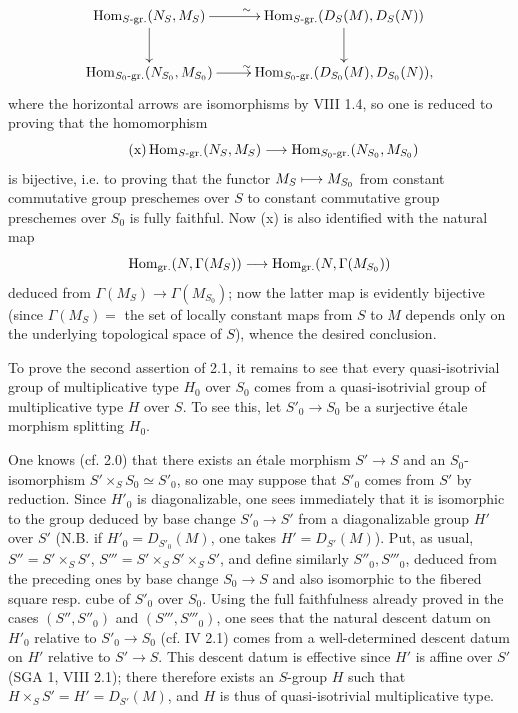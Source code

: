 \[
\xymatrix{\Hom_{S\text{-}\mathrm{gr.}}(N_S,M_S)\ar[r]^\sim\ar[d]&\Hom_{S\text{-}\mathrm{gr.}}(D_S(M),D_S(N))\ar[d]\\\Hom_{S_0\text{-}\mathrm{gr.}}(N_{S_0},M_{S_0})\ar[r]^\sim&\Hom_{S_0\text{-}\mathrm{gr.}}(D_{S_0}(M),D_{S_0}(N)),}
\]
where the horizontal arrows are isomorphisms by VIII 1.4, so one is reduced to proving that the homomorphism
\begin{equation}\tag{x}
\operatorname{Hom}_{S\text{-}\mathrm{gr.}}(N_S,M_S)\longrightarrow\operatorname{Hom}_{S_0\text{-}\mathrm{gr.}}(N_{S_0},M_{S_0})
\end{equation}
is bijective, i.e. to proving that the functor $M_S\longmapsto M_{S_0}$ from constant commutative group preschemes over $S$ to constant commutative group preschemes over $S_0$ is fully faithful. Now (x) is also identified with the natural map
\[
\operatorname{Hom}_{\mathrm{gr.}}(N,\Gamma(M_S))\longrightarrow\operatorname{Hom}_{\mathrm{gr.}}(N,\Gamma(M_{S_0}))
\]
deduced from $\Gamma(M_S)\to\Gamma(M_{S_0})$; now the latter map is evidently bijective (since $\Gamma(M_S)=$ the set of locally constant maps from $S$ to $M$ depends only on the underlying topological space of $S$), whence the desired conclusion.

To prove the second assertion of 2.1, it remains to see that every quasi-isotrivial group of multiplicative type $H_0$ over $S_0$ comes from a quasi-isotrivial group of multiplicative type $H$ over $S$. To see this, let $S'_0\to S_0$ be a surjective étale morphism splitting $H_0$.

One knows (cf. 2.0) that there exists an étale morphism $S'\to S$ and an $S_0$-isomorphism $S'\times_S S_0\simeq S'_0$, so one may suppose that $S'_0$ comes from $S'$ by reduction. Since $H'_0$ is diagonalizable, one sees immediately that it is isomorphic to the group deduced by base change $S'_0\to S'$ from a diagonalizable group $H'$ over $S'$ (N.B. if $H'_0=D_{S'_0}(M)$, one takes $H'=D_{S'}(M)$). Put, as usual, $S''=S'\times_S S'$, $S'''=S'\times_S S'\times_S S'$, and define similarly $S''_0,S'''_0$, deduced from the preceding ones by base change $S_0\to S$ and also isomorphic to the fibered square resp. cube of $S'_0$ over $S_0$. Using the full faithfulness already proved in the cases $(S'',S''_0)$ and $(S''',S'''_0)$, one sees that the natural descent datum on $H'_0$ relative to $S'_0\to S_0$ (cf. IV 2.1) comes from a well-determined descent datum on $H'$ relative to $S'\to S$. This descent datum is effective since $H'$ is affine over $S'$ (SGA 1, VIII 2.1); there therefore exists an $S$-group $H$ such that $H\times_S S'=H'=D_{S'}(M)$, and $H$ is thus of quasi-isotrivial multiplicative type.

